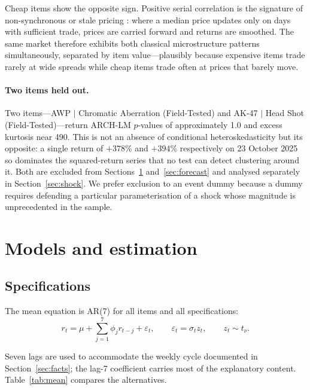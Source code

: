 \documentclass[11pt,a4paper]{article}
\begin{document}
Cheap items show the opposite sign. Positive serial correlation is the
signature of non-synchronous or stale pricing
\citep{ScholesWilliams1977,LoMacKinlay1990}: where a median price updates only
on days with sufficient trade, prices are carried forward and returns are
smoothed. The same market therefore exhibits both classical microstructure
patterns simultaneously, separated by item value---plausibly because expensive
items trade rarely at wide spreads while cheap items trade often at prices that
barely move.

\paragraph{Two items held out.}
Two items---AWP $\vert$ Chromatic Aberration (Field-Tested) and
AK-47 $\vert$ Head Shot (Field-Tested)---return ARCH-LM $p$-values of
approximately 1.0 and excess kurtosis near 490. This is not an absence of
conditional heteroskedasticity but its opposite: a single return of $+378\%$
and $+394\%$ respectively on 23 October 2025 so dominates the squared-return
series that no test can detect clustering around it. Both are excluded from
Sections~\ref{sec:models} and~\ref{sec:forecast} and analysed separately in
Section~\ref{sec:shock}. We prefer exclusion to an event dummy because a dummy
requires defending a particular parameterisation of a shock whose magnitude is
unprecedented in the sample.

\section{Models and estimation}\label{sec:models}

\subsection{Specifications}

The mean equation is AR(7) for all items and all specifications:
\begin{equation}
r_t = \mu + \sum_{j=1}^{7} \phi_j r_{t-j} + \varepsilon_t,
\qquad \varepsilon_t = \sigma_t z_t,
\qquad z_t \sim t_\nu .
\end{equation}

Seven lags are used to accommodate the weekly cycle documented in
Section~\ref{sec:facts}; the lag-7 coefficient carries most of the
explanatory content. Table~\ref{tab:mean} compares the alternatives.
\end{document}
